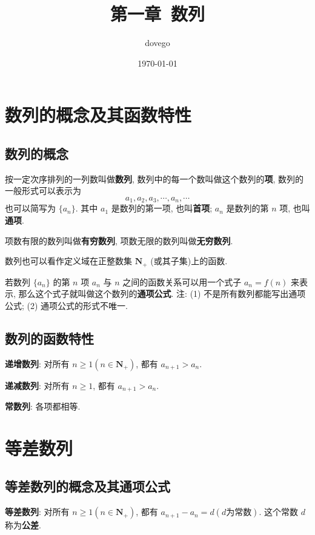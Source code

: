 \documentclass[titlepage]{ctexart}
\title{第一章~数列}
\author{dovego}
\date{\today}
\begin{document}
\maketitle


\section{数列的概念及其函数特性}

\subsection{数列的概念}

按一定次序排列的一列数叫做\textbf{数列}, 数列中的每一个数叫做这个数列的\textbf{项}, 数列的一般形式可以表示为
\[
a_{1}, a_{2}, a_{3}, \cdots, a_{n}, \cdots
\]
也可以简写为 $\{a_{n}\}$. 其中 $a_{1}$ 是数列的第一项, 也叫\textbf{首项}; $a_{n}$ 是数列的第 $n$ 项, 也叫\textbf{通项}.

项数有限的数列叫做\textbf{有穷数列}, 项数无限的数列叫做\textbf{无穷数列}.

数列也可以看作定义域在正整数集 $\mathbf{N_+}$ (或其子集)上的函数.

若数列 $\{a_{n}\}$ 的第 $n$ 项 $a_{n}$ 与 $n$ 之间的函数关系可以用一个式子 $a_{n} = f(n)$ 来表示, 那么这个式子就叫做这个数列的\textbf{通项公式}.
注: (1) 不是所有数列都能写出通项公式; (2) 通项公式的形式不唯一.

\subsection{数列的函数特性}

\textbf{递增数列}: 对所有 $n \geqslant 1(n \in \mathbf{N_+})$, 都有 $a_{n + 1} > a_{n}$.

\textbf{递减数列}: 对所有 $n \geqslant 1$, 都有 $a_{n+1} > a_{n}$.

\textbf{常数列}: 各项都相等.


\section{等差数列}

\subsection{等差数列的概念及其通项公式}

\textbf{等差数列}: 对所有 $n \geqslant 1(n \in \mathbf{N_+})$, 都有 $a_{n+1} - a_{n} = d(d\text{为常数})$. 这个常数 $d$ 称为\textbf{公差}.
\end{document}
